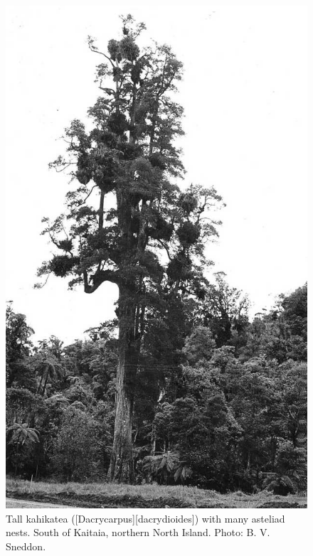 \begin{figure}[!htb]
	\centering
	\begin{minipage}[t]{0.437\textwidth}
		\centering
		\includegraphics[width=\textwidth]{graphics/figure39kahikatea.jpg}
    	\caption[Tall kahikatea with many asteliad nests]{Tall kahikatea ([Dacrycarpus][dacrydioides]) with many asteliad nests.
    	South of Kaitaia, northern North Island.
    	Photo: B. V. Sneddon.}%
    	\label{fig:39kahikatea}
	\end{minipage}\hfill%
	\begin{minipage}[t]{0.543\textwidth}

\end{minipage}
\end{figure}
